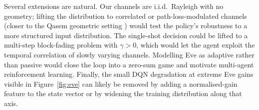 \documentclass[conference]{IEEEtran}
\begin{document}
Several extensions are natural. Our channels are i.i.d.\ Rayleigh with
no geometry; lifting the distribution to correlated or
path-loss-modulated channels (closer to the Qasem geometric setting
\cite{qasem2024pls}) would test the policy's robustness to a more
structured input distribution. The single-shot decision could be
lifted to a multi-step block-fading problem with $\gamma > 0$, which
would let the agent exploit the temporal correlation of slowly
varying channels. Modelling Eve as adaptive rather than passive would
close the loop into a zero-sum game and motivate multi-agent
reinforcement learning. Finally, the small DQN degradation at extreme
Eve gains visible in Figure~\ref{fig:eve} can likely be removed by
adding a normalised-gain feature to the state vector or by widening
the training distribution along that axis.



\end{document}

